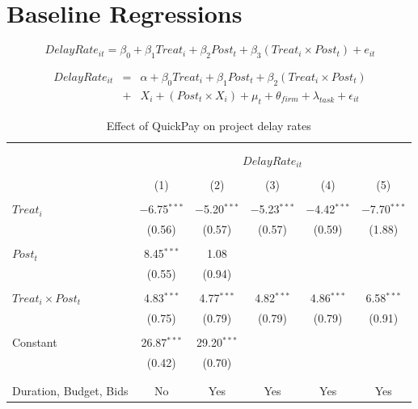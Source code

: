 \documentclass[
]{article}
\begin{document}
\hypertarget{baseline-regressions}{%
\section{Baseline Regressions}\label{baseline-regressions}}

\[ DelayRate_{it} = \beta_0 + \beta_1 Treat_i + \beta_2 Post_t + \beta_3 (Treat_i \times Post_t) + e_{it}\]

\[ \begin{aligned} DelayRate_{it} &=& \alpha+\beta_0 Treat_i + \beta_1 Post_t + \beta_2 (Treat_i \times Post_t)\\
&+&  X_i + (Post_t \times X_i) + \mu_t + \theta_{firm} + \lambda_{task}+ \epsilon_{it}
\end{aligned}\]

\begin{table}[H] \centering 
  \caption{Effect of QuickPay on project delay rates} 
  \label{} 
\small 
\begin{tabular}{@{\extracolsep{-2pt}}lccccc} 
\\[-1.8ex]\hline 
\hline \\[-1.8ex] 
\\[-1.8ex] & \multicolumn{5}{c}{$DelayRate_{it}$} \\ 
\\[-1.8ex] & (1) & (2) & (3) & (4) & (5)\\ 
\hline \\[-1.8ex] 
 $Treat_i$ & $-$6.75$^{***}$ & $-$5.20$^{***}$ & $-$5.23$^{***}$ & $-$4.42$^{***}$ & $-$7.70$^{***}$ \\ 
  & (0.56) & (0.57) & (0.57) & (0.59) & (1.88) \\ 
  & & & & & \\ 
 $Post_t$ & 8.45$^{***}$ & 1.08 &  &  &  \\ 
  & (0.55) & (0.94) &  &  &  \\ 
  & & & & & \\ 
 $Treat_i \times Post_t$ & 4.83$^{***}$ & 4.77$^{***}$ & 4.82$^{***}$ & 4.86$^{***}$ & 6.58$^{***}$ \\ 
  & (0.75) & (0.79) & (0.79) & (0.79) & (0.91) \\ 
  & & & & & \\ 
 Constant & 26.87$^{***}$ & 29.20$^{***}$ &  &  &  \\ 
  & (0.42) & (0.70) &  &  &  \\ 
  & & & & & \\ 
\hline \\[-1.8ex] 
Duration, Budget, Bids & No & Yes & Yes & Yes & Yes \\ 

\end{tabular}
\end{table}
\end{document}
